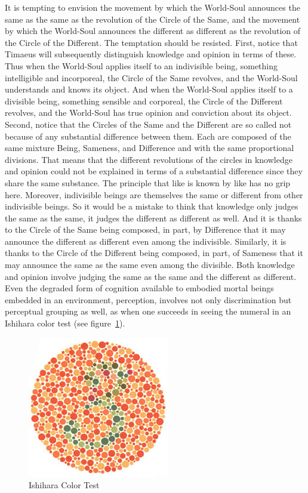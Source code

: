 It is tempting to envision the movement by which the World-Soul announces the same as the same as the revolution of the Circle of the Same, and the movement by which the World-Soul announces the different as different as the revolution of the Circle of the Different. The temptation should be resisted. First, notice that Timaeus will subsequently distinguish knowledge and opinion in terms of these. Thus when the World-Soul applies itself to an indivisible being, something intelligible and incorporeal, the Circle of the Same revolves, and the World-Soul understands and knows its object. And when the World-Soul applies itself to a divisible being, something sensible and corporeal, the Circle of the Different revolves, and the World-Soul has true opinion and conviction about its object. Second, notice that the Circles of the Same and the Different are so called not because of any substantial difference between them. Each are composed of the same mixture Being, Sameness, and Difference and with the same proportional divisions. That means that the different revolutions of the circles in knowledge and opinion could not be explained in terms of a substantial difference since they share the same substance. The principle that like is known by like has no grip here. Moreover, indivisible beings are themselves the same or different from other indivisible beings. So it would be a mistake to think that knowledge only judges the same as the same, it judges the different as different as well. And it is thanks to the Circle of the Same being composed, in part, by Difference that it may announce the different as different even among the indivisible. Similarly, it is thanks to the Circle of the Different being composed, in part, of Sameness that it may announce the same as the same even among the divisible. Both knowledge and opinion involve judging the same as the same and the different as different. Even the degraded form of cognition available to embodied mortal beings embedded in an environment, perception, involves not only discrimination but perceptual grouping as well, as when one succeeds in seeing the numeral in an Ishihara color test (see figure~\ref{fig:ishihara}).

\begin{figure}[htbp]
	\centering
		\includegraphics[scale=1.5]{graphics/ishihara.jpg}
	\caption{Ishihara Color Test}
	\label{fig:ishihara}
\end{figure}

